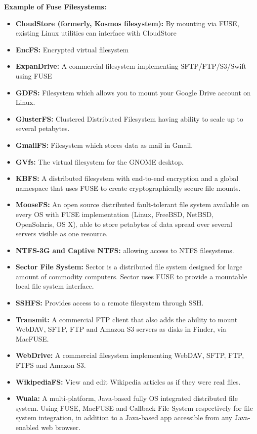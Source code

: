 \textbf{Example of Fuse Filesystems:\cite{wiki:Filesystem_in_Userspace}} 
\begin{itemize}

\item \textbf{CloudStore (formerly, Kosmos filesystem):} By mounting via FUSE, existing Linux utilities can interface with CloudStore
\item \textbf{EncFS:} Encrypted virtual filesystem
\item \textbf{ExpanDrive:} A commercial filesystem implementing SFTP/FTP/S3/Swift using FUSE
\item \textbf{GDFS:} Filesystem which allows you to mount your Google Drive account on Linux.

\item \textbf{GlusterFS:} Clustered Distributed Filesystem having ability to scale up to several petabytes.
\item \textbf{GmailFS:} Filesystem which stores data as mail in Gmail.
\item \textbf{GVfs:} The virtual filesystem for the GNOME desktop.
\item \textbf{KBFS:} A distributed filesystem with end-to-end encryption and a global namespace that uses FUSE to create cryptographically secure file mounts.
\item \textbf{MooseFS:} An open source distributed fault-tolerant file system available on every OS with FUSE implementation (Linux, FreeBSD, NetBSD, OpenSolaris, OS X), able to store petabytes of data spread over several servers visible as one resource.
\item \textbf{NTFS-3G and Captive NTFS:} allowing access to NTFS filesystems.
\item \textbf{Sector File System:} Sector is a distributed file system designed for large amount of commodity computers. Sector uses FUSE to provide a mountable local file system interface.
\item \textbf{SSHFS:} Provides access to a remote filesystem through SSH.
\item \textbf{Transmit:} A commercial FTP client that also adds the ability to mount WebDAV, SFTP, FTP and Amazon S3 servers as disks in Finder, via MacFUSE.
\item \textbf{WebDrive:} A commercial filesystem implementing WebDAV, SFTP, FTP, FTPS and Amazon S3.
\item \textbf{WikipediaFS:} View and edit Wikipedia articles as if they were real files.
\item \textbf{Wuala:} A multi-platform, Java-based fully OS integrated distributed file system. Using FUSE, MacFUSE and Callback File System respectively for file system integration, in addition to a Java-based app accessible from any Java-enabled web browser.
\end{itemize}

